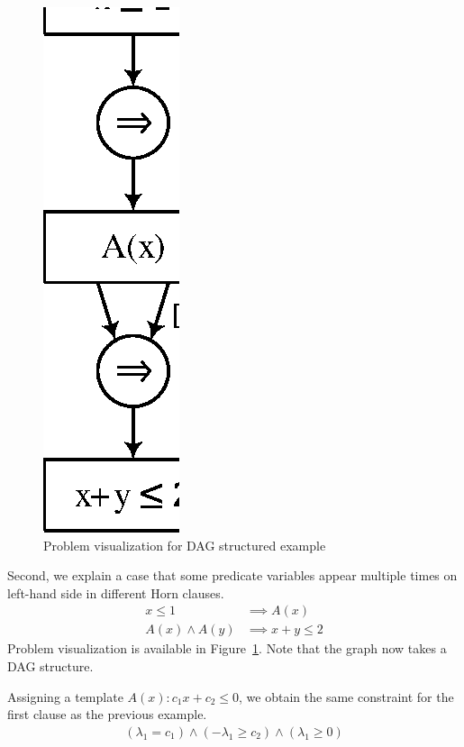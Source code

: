 \begin{figure}
\begin{center}
\includegraphics[scale=0.8]{figures/ex2-1.eps}
\end{center}
\caption{Problem visualization for DAG structured example}
\label{fig:ex21}
\end{figure}

Second, we explain a case that some predicate variables appear
multiple times on left-hand side in different Horn clauses.
\begin{align*}
x \leq 1 & \implies A(x) \\
A(x) \wedge A(y) & \implies x+y \leq 2
\end{align*}
Problem visualization is available in Figure~\ref{fig:ex21}. Note
that the graph now takes a DAG structure.

Assigning a template $A(x) : c_1 x + c_2 \leq 0$, we obtain the same
constraint for the first clause as the previous example.
\begin{align} \label{eq:constr1}
(\lambda_1 = c_1) \wedge (- \lambda_1 \geq c_2) \wedge (\lambda_1 \geq 0)
\end{align}

